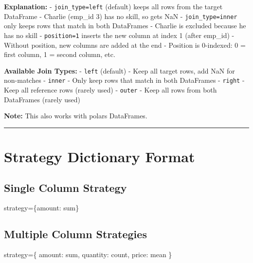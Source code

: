 \documentclass[
  letterpaper,
]{scrbook}
\newenvironment{Shaded}{\begin{snugshade}}{\end{snugshade}}
\newcommand{\NormalTok}[1]{\textcolor[rgb]{0.00,0.23,0.31}{#1}}
\newcommand{\OperatorTok}[1]{\textcolor[rgb]{0.37,0.37,0.37}{#1}}
\newcommand{\StringTok}[1]{\textcolor[rgb]{0.13,0.47,0.30}{#1}}
\begin{document}
\textbf{Explanation:} -
\texttt{join\_type=\textquotesingle{}left\textquotesingle{}} (default)
keeps all rows from the target DataFrame - Charlie (emp\_id 3) has no
skill, so gets NaN -
\texttt{join\_type=\textquotesingle{}inner\textquotesingle{}} only keeps
rows that match in both DataFrames - Charlie is excluded because he has
no skill - \texttt{position=1} inserts the new column at index 1 (after
emp\_id) - Without position, new columns are added at the end - Position
is 0-indexed: 0 = first column, 1 = second column, etc.

\textbf{Available Join Types:} -
\texttt{\textquotesingle{}left\textquotesingle{}} (default) - Keep all
target rows, add NaN for non-matches -
\texttt{\textquotesingle{}inner\textquotesingle{}} - Only keep rows that
match in both DataFrames -
\texttt{\textquotesingle{}right\textquotesingle{}} - Keep all reference
rows (rarely used) - \texttt{\textquotesingle{}outer\textquotesingle{}}
- Keep all rows from both DataFrames (rarely used)

\textbf{Note:} This also works with polars DataFrames.

\begin{center}\rule{0.5\linewidth}{0.5pt}\end{center}

\section{Strategy Dictionary Format}\label{strategy-dictionary-format}

\subsection{Single Column Strategy}\label{single-column-strategy}

\begin{Shaded}
\begin{Highlighting}[]
\NormalTok{strategy}\OperatorTok{=}\NormalTok{\{}\StringTok{\textquotesingle{}amount\textquotesingle{}}\NormalTok{: }\StringTok{\textquotesingle{}sum\textquotesingle{}}\NormalTok{\}}
\end{Highlighting}
\end{Shaded}

\subsection{Multiple Column
Strategies}\label{multiple-column-strategies}

\begin{Shaded}
\begin{Highlighting}[]
\NormalTok{strategy}\OperatorTok{=}\NormalTok{\{}
    \StringTok{\textquotesingle{}amount\textquotesingle{}}\NormalTok{: }\StringTok{\textquotesingle{}sum\textquotesingle{}}\NormalTok{,}
    \StringTok{\textquotesingle{}quantity\textquotesingle{}}\NormalTok{: }\StringTok{\textquotesingle{}count\textquotesingle{}}\NormalTok{,}
    \StringTok{\textquotesingle{}price\textquotesingle{}}\NormalTok{: }\StringTok{\textquotesingle{}mean\textquotesingle{}}
\NormalTok{\}}
\end{Highlighting}
\end{Shaded}
\end{document}
